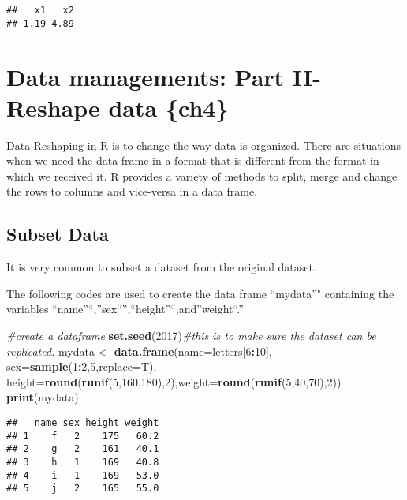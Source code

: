\documentclass[]{book}
\newenvironment{Shaded}{\begin{snugshade}}{\end{snugshade}}
\newcommand{\KeywordTok}[1]{\textcolor[rgb]{0.13,0.29,0.53}{\textbf{#1}}}
\newcommand{\DataTypeTok}[1]{\textcolor[rgb]{0.13,0.29,0.53}{#1}}
\newcommand{\DecValTok}[1]{\textcolor[rgb]{0.00,0.00,0.81}{#1}}
\newcommand{\StringTok}[1]{\textcolor[rgb]{0.31,0.60,0.02}{#1}}
\newcommand{\CommentTok}[1]{\textcolor[rgb]{0.56,0.35,0.01}{\textit{#1}}}
\newcommand{\OperatorTok}[1]{\textcolor[rgb]{0.81,0.36,0.00}{\textbf{#1}}}
\newcommand{\NormalTok}[1]{#1}
\theoremstyle{definition}
\theoremstyle{definition}
\theoremstyle{definition}
\theoremstyle{remark}
\begin{document}
\begin{verbatim}
##   x1   x2 
## 1.19 4.89
\end{verbatim}

\chapter{Data managements: Part II- Reshape data
\{ch4\}}\label{data-managements-part-ii--reshape-data-ch4}

Data Reshaping in R is to change the way data is organized. There are
situations when we need the data frame in a format that is different
from the format in which we received it. R provides a variety of methods
to split, merge and change the rows to columns and vice-versa in a data
frame.

\section{Subset Data}\label{subset-data}

It is very common to subset a dataset from the original dataset.

The following codes are used to create the data frame ``mydata''"
containing the variables
``name''``,''sex``'',``height''``,and''weight``.''

\begin{Shaded}
\begin{Highlighting}[]
\CommentTok{#create a dataframe}
\KeywordTok{set.seed}\NormalTok{(}\DecValTok{2017}\NormalTok{)}\CommentTok{#this is to make sure the dataset can be replicated.}
\NormalTok{mydata <-}\StringTok{ }\KeywordTok{data.frame}\NormalTok{(}\DataTypeTok{name=}\NormalTok{letters[}\DecValTok{6}\OperatorTok{:}\DecValTok{10}\NormalTok{],  }\DataTypeTok{sex=}\KeywordTok{sample}\NormalTok{(}\DecValTok{1}\OperatorTok{:}\DecValTok{2}\NormalTok{,}\DecValTok{5}\NormalTok{,}\DataTypeTok{replace=}\NormalTok{T), }\DataTypeTok{height=}\KeywordTok{round}\NormalTok{(}\KeywordTok{runif}\NormalTok{(}\DecValTok{5}\NormalTok{,}\DecValTok{160}\NormalTok{,}\DecValTok{180}\NormalTok{),}\DecValTok{2}\NormalTok{),}\DataTypeTok{weight=}\KeywordTok{round}\NormalTok{(}\KeywordTok{runif}\NormalTok{(}\DecValTok{5}\NormalTok{,}\DecValTok{40}\NormalTok{,}\DecValTok{70}\NormalTok{),}\DecValTok{2}\NormalTok{))}
\KeywordTok{print}\NormalTok{(mydata)}
\end{Highlighting}
\end{Shaded}

\begin{verbatim}
##   name sex height weight
## 1    f   2    175   60.2
## 2    g   2    161   40.1
## 3    h   1    169   40.8
## 4    i   1    169   53.0
## 5    j   2    165   55.0
\end{verbatim}
\end{document}
